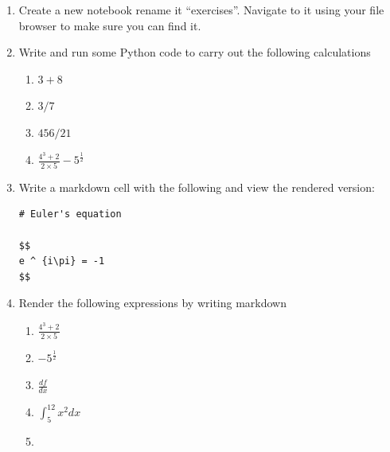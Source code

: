 \begin{enumerate}

\item 

Create a new notebook rename it “exercises”. Navigate to it using your file browser to make sure you can find it.

\item 

Write and run some Python code to carry out the following calculations
\begin{enumerate}

\item 

\(3 + 8\)

\item 

\(3 / 7\)

\item 

\(456 / 21\)

\item 

\(\frac{4 ^ 3 + 2}{2\times 5} - 5 ^ {\frac{1}{2}}\)

\end{enumerate}

\item 

Write a markdown cell with the following and view the rendered version:

\begin{verbatim}
# Euler's equation

$$
e ^ {i\pi} = -1
$$
\end{verbatim}

\item 

Render the following expressions by writing markdown
\begin{enumerate}

\item 

\(\frac{4 ^ 3 + 2}{2\times 5}\)

\item 

\(- 5 ^ {\frac{1}{2}}\)

\item 

\(\frac{df}{dx}\)

\item 

\(\int_{5}^{12}x^2dx\)

\item 


\end{enumerate}
\end{enumerate}
